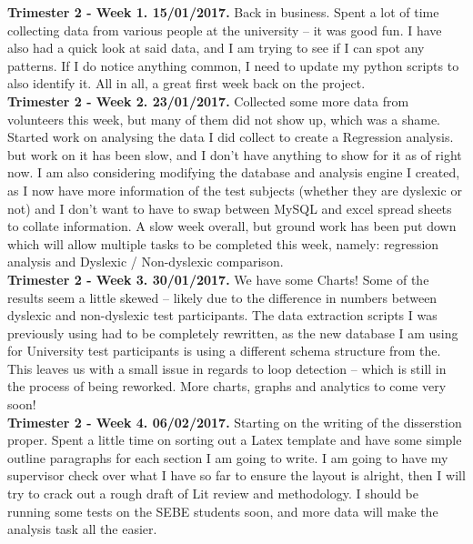 \begin{appendices}
		
		\textbf{Trimester 2 - Week 1. 15/01/2017.}
		Back in business.
		Spent a lot of time collecting data from various people at the university – it was good fun.
		I have also had a quick look at said data, and I am trying to see if I can spot any patterns. If I do notice anything common, I need to update my python scripts to also identify it.
		All in all, a great first week back on the project.
		\\
		
		\textbf{Trimester 2 - Week 2. 23/01/2017.}
		Collected some more data from volunteers this week, but many of them did not show up, which was a shame.
		Started work on analysing the data I did collect to create a Regression analysis. but work on it has been slow, and I don’t have anything to show for it as of right now.
		I am also considering modifying the database and analysis engine I created, as I now have more information of the test subjects (whether they are dyslexic or not) and I don’t want to have to swap between MySQL and excel spread sheets to collate information.
		A slow week overall, but ground work has been put down which will allow multiple tasks to be completed this week, namely: regression analysis and Dyslexic / Non-dyslexic comparison.\\
		
		\textbf{Trimester 2 - Week 3. 30/01/2017.}
		We have some Charts!
		Some of the results seem a little skewed – likely due to the difference in numbers between dyslexic and non-dyslexic test participants.
		The data extraction scripts I was previously using had to be completely rewritten, as the new database I am using for University test participants is using a different schema structure from the. This leaves us with a small issue in regards to loop detection – which is still in the process of being reworked.
		More charts, graphs and analytics to come very soon!\\
		
		\textbf{Trimester 2 - Week 4. 06/02/2017.}
		Starting on the writing of the disserstion proper.
		Spent a little time on sorting out a Latex template and have some simple outline paragraphs for each section I am going to write.
		I am going to have my supervisor check over what I have so far to ensure the layout is alright, then I will try to crack out a rough draft of Lit review and methodology.
		I should be running some tests on the SEBE students soon, and more data will make the analysis task all the easier.\\
		

\end{appendices}
